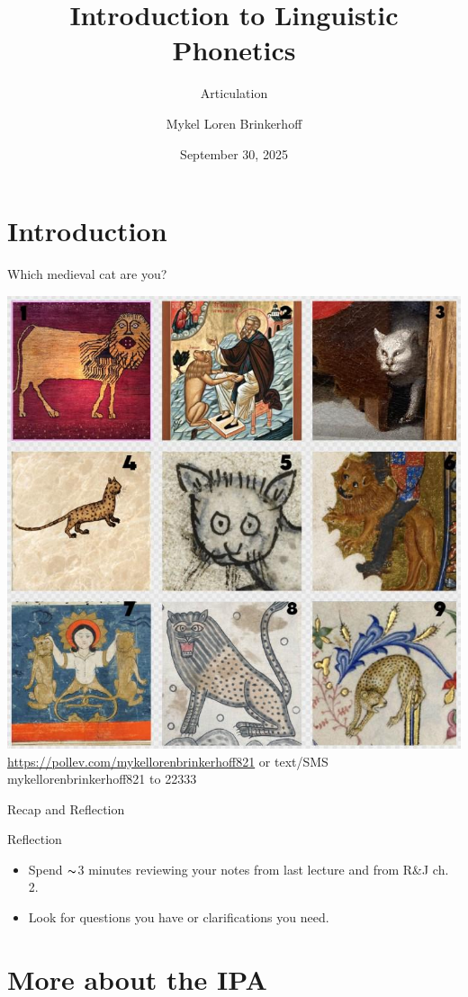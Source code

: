 \documentclass[professionalfonts]{beamer}
\title[LING 450/550] %
{Introduction to Linguistic Phonetics}
\subtitle{Articulation}
\author[Brinkerhoff] %
{Mykel Loren Brinkerhoff}
\institute[UW] %
{University of Washington}
\date[2025-09-30] %
{September 30, 2025}
\begin{document}
\begin{frame}
    \titlepage
\end{frame}

\section{Introduction}

\begin{frame}{Which medieval cat are you?}
    
    \begin{center}
        \includegraphics[width = .5\linewidth]{figs/MedievalCatIcebreaker.jpeg}
        \url{https://pollev.com/mykellorenbrinkerhoff821} or text/SMS mykellorenbrinkerhoff821 to 22333
    \end{center}
\end{frame}
\begin{frame}{Recap and Reflection}
    \begin{block}{Reflection}
        \begin{itemize}
            \item Spend $\thicksim$3 minutes reviewing your notes from last lecture and from R\&J ch. 2.
            \item Look for questions you have or clarifications you need. 
        \end{itemize}
    \end{block}
\end{frame}

\section{More about the IPA}
\end{document}
